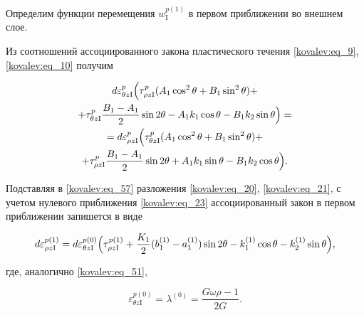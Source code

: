 Определим функции перемещения $w_\mathrm{I}^{p(1)}$  в первом приближении во внешнем слое. 

Из соотношений ассоциированного закона пластического течения \eqref{kovalev:eq_9}, \eqref{kovalev:eq_10} получим

\begin{multline}\label{kovalev:eq_57}

d\varepsilon_{\theta z\mathrm{I}}^p

\Bigl(\tau_{\rho z\mathrm{I}}^p (A_1\cos^2\theta+B_1\sin^2\theta)+ 

\\

+ \tau_{\theta z\mathrm{I}}^p\frac{B_1-A_1}{2}\sin2\theta-A_1k_1\cos\theta-B_1k_2\sin\theta\Bigr)=

\\

=d\varepsilon_{\rho z\mathrm{I}}^p

\Bigl(\tau_{\theta z\mathrm{I}}^p (A_1\cos^2\theta+B_1\sin^2\theta )+ \\

 +\tau_{\rho z\mathrm{I}}^p\frac{B_1-A_1}{2}\sin2\theta+A_1k_1\sin\theta-B_1k_2\cos\theta\Bigr).

\end{multline}



Подставляя в \eqref{kovalev:eq_57} разложения \eqref{kovalev:eq_20}, \eqref{kovalev:eq_21}, с учетом нулевого приближения \eqref{kovalev:eq_23} ассоциированный закон в первом приближении  запишется в виде

 \begin{equation}\label{kovalev:eq_58}

  d\varepsilon_{\rho z\mathrm{I}}^{p(1)}=

  d\varepsilon_{\theta z\mathrm{I}}^{p(0)}

  \Bigl(\tau_{\rho z\mathrm{I}}^{p(1)}+ \frac{K_1}{2} (b_1^{(1)}-a_1^{(1)})\sin2\theta-

  k_1^{(1)}\cos\theta-k_2^{(1)}\sin\theta\Bigr),

 \end{equation}

где, аналогично  \eqref{kovalev:eq_51},

\begin{equation}\label{kovalev:eq_59}

  \varepsilon_{\theta z\mathrm{I}}^{p(0)}=\lambda^{(0)}=\frac{G\omega\rho-1}{2G}.

\end{equation}



